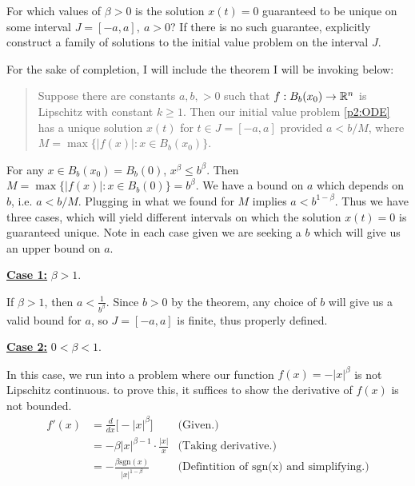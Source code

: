 For which values of $\beta > 0$ is the solution $x(t) = 0$ guaranteed to be unique on some interval $J = [-a, a], \ a > 0$? If there is no such guarantee, explicitly construct a family of solutions to the initial value problem on the interval $J$.   
\partbreak

\begin{solution}

    For the sake of completion, I will include the theorem I will be invoking below:

    \alignbreak
    \begin{quote}
            Suppose there are constants $a, b, > 0$ such that $f:B_b(x_0) \rightarrow \mathbb{R}^n$ is Lipschitz with constant $k \geq 1$. Then our initial value problem \ref{p2:ODE} has a unique solution $x(t)$ for $t \in J = [-a, a]$ provided $a < b/M$, where $M = \max \{|f(x)| : x \in B_b(x_0)\}.$
    \end{quote}
    \alignbreak

    For any $x \in B_b(x_0) = B_b(0)$, $x^\beta \leq b^\beta$. Then $M = \max \{|f(x)| : x \in B_b(0)\} = b^\beta$. We have a bound on $a$ which depends on $b$, i.e. $a < b/M$. Plugging in what we found for $M$ implies $a < b^{1 - \beta}$. Thus we have three cases, which will yield different intervals on which the solution $x(t) = 0$ is guaranteed unique. Note in each case given we are seeking a $b$ which will give us an upper bound on $a$.

    \jump
    \underline{\textbf{Case 1:}} $\beta > 1$. 
    \jump
    
    If $\beta > 1$, then $a < \frac{1}{b^\beta}$. Since $b > 0$ by the theorem, any choice of $b$ will give us a valid bound for $a$, so $J = [-a, a]$ is finite, thus properly defined. 

    \jump
    \underline{\textbf{Case 2:}} $0 < \beta < 1$.
    \jump
    
    In this case, we run into a problem where our function $f(x) = -|x|^\beta$ is not Lipschitz continuous. to prove this, it suffices to show the derivative of $f(x)$ is not bounded. 
    \newpage
    \alignbreak
    \begin{align}
        f'(x) &= \frac{d}{dx}\Big[ -|x|^\beta \Big] &\text{(Given.)}\nonumber\\
        &= -\beta|x|^{\beta - 1} \cdot \frac{|x|}{x} &\text{(Taking derivative.)}\nonumber\\
        &= -\frac{\beta\text{sgn}(x)}{|x|^{1 - \beta}} &\text{(Defintition of sgn(x) and simplifying.)}
    \end{align}
    \alignbreak


\end{solution}
